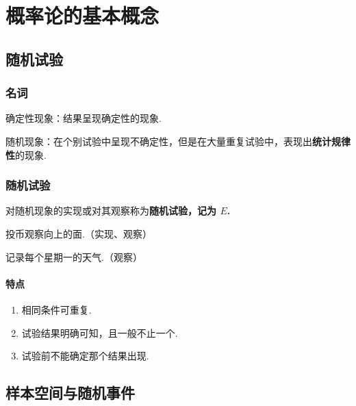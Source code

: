 \documentclass[12pt, a4paper, oneside, UTF8]{ctexbook}
\begin{document}
% 
\else
\fi
\chapter{概率论的基本概念}

\section{随机试验}

\subsection{名词}

\begin{defn}
    确定性现象：结果呈现确定性的现象.
\end{defn}

\begin{defn}
    随机现象：在个别试验中呈现不确定性，但是在大量重复试验中，表现出\textbf{统计规律性}的现象.
\end{defn}

\subsection{随机试验}

\begin{defn}
    对随机现象的实现或对其观察称为\bf{随机试验}，记为 \(E\).
\end{defn}

\begin{example}
    投币观察向上的面.（实现、观察）
\end{example}

\begin{example}
    记录每个星期一的天气.（观察）
\end{example}

\subsubsection{特点}
\begin{enumerate}
    \item 相同条件可重复.
    \item 试验结果明确可知，且一般不止一个.
    \item 试验前不能确定那个结果出现.
\end{enumerate}

\section{样本空间与随机事件}
\end{document}

